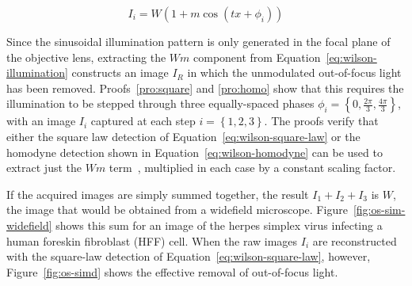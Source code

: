 \begin{equation} \label{eq:wilson-illumination}
I_i = W \left( 1 + m \cos \left(t x + \phi_i \right) \right)
\end{equation}

Since the sinusoidal illumination pattern is only generated in the focal plane of the objective lens, extracting the $Wm$ component from Equation~\ref{eq:wilson-illumination} constructs an image $I_R$ in which the unmodulated out-of-focus light has been removed. 
Proofs~\ref{pro:square} and \ref{pro:homo} show that this requires the illumination to be stepped through three equally-spaced phases $\phi_i = \left\lbrace0, \frac{2\pi}{3}, \frac{4\pi}{3}\right\rbrace$, with an image $I_i$ captured at each step $i=\left\lbrace1,2,3\right\rbrace$. 
The proofs verify that either the square law detection of Equation~\ref{eq:wilson-square-law} or the homodyne detection shown in Equation~\ref{eq:wilson-homodyne} can be used to extract just the $Wm$ term~\cite{neil1997method}, multiplied in each case by a constant scaling factor. 

If the acquired images are simply summed together, the result $I_1+I_2+I_3$ is $W$, the image that would be obtained from a widefield microscope. 
Figure~\ref{fig:os-sim-widefield} shows this sum for an image of the herpes simplex virus infecting a human foreskin fibroblast (HFF) cell. 
When the raw images $I_i$ are reconstructed with the square-law detection of Equation~\ref{eq:wilson-square-law}, however, Figure~\ref{fig:os-simd} shows the effective removal of out-of-focus light. 

